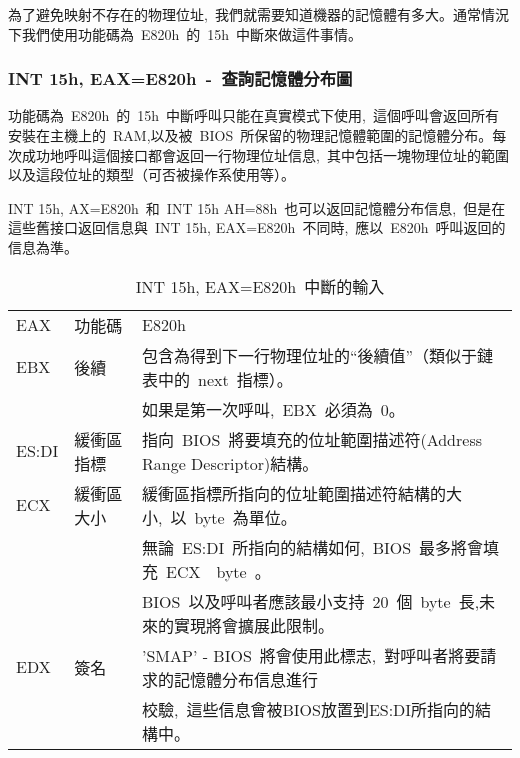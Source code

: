 為了避免映射不存在的物理位址,~我們就需要知道機器的記憶體有多大。通常情況下我們使用功能碼為~E820h~的~15h~中斷來做這件事情。

\subsubsection{INT 15h, EAX=E820h~-~查詢記憶體分布圖}

功能碼為~E820h~的~15h~中斷呼叫只能在真實模式下使用,~這個呼叫會返回所有安裝在主機上的~RAM,以及被~BIOS~所保留的物理記憶體範圍的記憶體分布。每次成功地呼叫這個接口都會返回一行物理位址信息,~其中包括一塊物理位址的範圍以及這段位址的類型（可否被操作系使用等）。

INT 15h, AX=E820h~和~INT 15h AH=88h~也可以返回記憶體分布信息,~但是在這些舊接口返回信息與~INT 15h, EAX=E820h~不同時,~應以~E820h~呼叫返回的信息為準。

\begin{center}\begin{longtable}{lll}
\caption[]{INT 15h, EAX=E820h~中斷的輸入}\label{e820_input}\\
\hline
EAX & 功能碼 & E820h\\
EBX & 後續   & 包含為得到下一行物理位址的“後續值”（類似于鏈表中的~next~指標）。\\
& & 如果是第一次呼叫,~EBX~必須為~0。\\
ES:DI & 緩衝區指標 & 指向~BIOS~將要填充的位址範圍描述符(Address Range Descriptor)結構。\\
ECX & 緩衝區大小 & 緩衝區指標所指向的位址範圍描述符結構的大小,~以~byte~為單位。\\
& & 無論~ES:DI~所指向的結構如何,~BIOS~最多將會填充~ECX~~byte~。\\
& & BIOS~以及呼叫者應該最小支持~20~個~byte~長,未來的實現將會擴展此限制。\\
EDX & 簽名 & 'SMAP' - BIOS~將會使用此標志,~對呼叫者將要請求的記憶體分布信息進行\\
& & 校驗,~這些信息會被BIOS放置到ES:DI所指向的結構中。\\
\hline
\end{longtable}\end{center}

